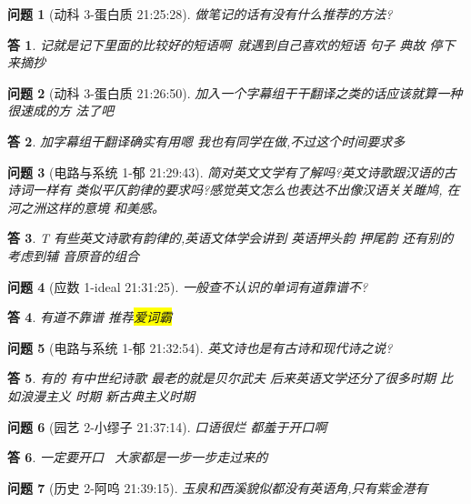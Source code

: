 \documentclass[utf8,a4paper]{ctexart}
\theoremstyle{nonumberplain}
\newtheorem{answer}{\color{blue}答}
\theoremstyle{nonumberplain}
\newtheorem{question}{\color{magenta}问题}
\newcommand\tips[1]{\colorbox{yellow}{#1}}
\begin{document}
\begin{question}[动科 3-蛋白质 21:25:28]
  做笔记的话有没有什么推荐的方法?
\end{question}

\begin{answer}
  记就是记下里面的比较好的短语啊~就遇到自己喜欢的短语 句子 典故 停下来摘抄
\end{answer}

\begin{question}[动科 3-蛋白质 21:26:50]
  加入一个字幕组干干翻译之类的话应该就算一种很速成的方 法了吧
\end{question}
\begin{answer}
  加字幕组干翻译确实有用嗯 我也有同学在做,不过这个时间要求多
\end{answer}

\begin{question}[电路与系统 1-郁 21:29:43]
  简对英文文学有了解吗?英文诗歌跟汉语的古诗词一样有 类似平仄韵律的要求吗?感觉英文怎么也表达不出像汉语关关雎鸠, 在河之洲这样的意境 和美感。
\end{question}

\begin{answer}
  T 有些英文诗歌有韵律的,英语文体学会讲到 英语押头韵 押尾韵 还有别的 考虑到辅 音原音的组合
\end{answer}

\begin{question}[应数 1-ideal 21:31:25]
  一般查不认识的单词有道靠谱不?
\end{question}

\begin{answer}
  有道不靠谱 推荐\tips{爱词霸}
\end{answer}


\begin{question}[电路与系统 1-郁 21:32:54]
  英文诗也是有古诗和现代诗之说?
\end{question}

\begin{answer}
  有的 有中世纪诗歌 最老的就是贝尔武夫 后来英语文学还分了很多时期 比如浪漫主义 时期 新古典主义时期
\end{answer}

\begin{question}[园艺 2-小缪子 21:37:14]
  口语很烂 都羞于开口啊
\end{question}
\begin{answer}
  一定要开口 ~大家都是一步一步走过来的~
\end{answer}

\begin{question}[历史 2-阿呜 21:39:15]
  玉泉和西溪貌似都没有英语角,只有紫金港有
\end{question}
\end{document}
